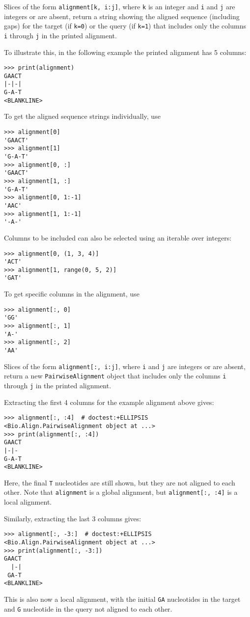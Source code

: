 Slices of the form \verb+alignment[k, i:j]+, where \verb+k+ is an integer and \verb+i+ and \verb+j+ are integers or are absent, return a string showing the aligned sequence (including gaps) for the target (if \verb+k=0+) or the query (if \verb+k=1+) that includes only the columns \verb+i+ through \verb+j+ in the printed alignment.

To illustrate this, in the following example the printed alignment has 5 columns:

\begin{verbatim}
>>> print(alignment)
GAACT
|-|-|
G-A-T
<BLANKLINE>
\end{verbatim}

To get the aligned sequence strings individually, use
\begin{verbatim}
>>> alignment[0]
'GAACT'
>>> alignment[1]
'G-A-T'
>>> alignment[0, :]
'GAACT'
>>> alignment[1, :]
'G-A-T'
>>> alignment[0, 1:-1]
'AAC'
>>> alignment[1, 1:-1]
'-A-'
\end{verbatim}

Columns to be included can also be selected using an iterable over integers:
\begin{verbatim}
>>> alignment[0, (1, 3, 4)]
'ACT'
>>> alignment[1, range(0, 5, 2)]
'GAT'
\end{verbatim}

To get specific columns in the alignment, use
\begin{verbatim}
>>> alignment[:, 0]
'GG'
>>> alignment[:, 1]
'A-'
>>> alignment[:, 2]
'AA'
\end{verbatim}

Slices of the form \verb+alignment[:, i:j]+, where \verb+i+ and \verb+j+ are integers or are absent, return a new \verb+PairwiseAlignment+ object that includes only the columns \verb+i+ through \verb+j+ in the printed alignment.

Extracting the first 4 columns for the example alignment above gives:
\begin{verbatim}
>>> alignment[:, :4]  # doctest:+ELLIPSIS
<Bio.Align.PairwiseAlignment object at ...>
>>> print(alignment[:, :4])
GAACT
|-|-
G-A-T
<BLANKLINE>
\end{verbatim}
Here, the final \verb+T+ nucleotides are still shown, but they are not aligned to each other. Note that \verb+alignment+ is a global alignment, but \verb+alignment[:, :4]+ is a local alignment.

Similarly, extracting the last 3 columns gives:
\begin{verbatim}
>>> alignment[:, -3:]  # doctest:+ELLIPSIS
<Bio.Align.PairwiseAlignment object at ...>
>>> print(alignment[:, -3:])
GAACT
  |-|
 GA-T
<BLANKLINE>
\end{verbatim}
This is also now a local alignment, with the initial \verb+GA+ nucleotides in the target and \verb+G+ nucleotide in the query not aligned to each other.

